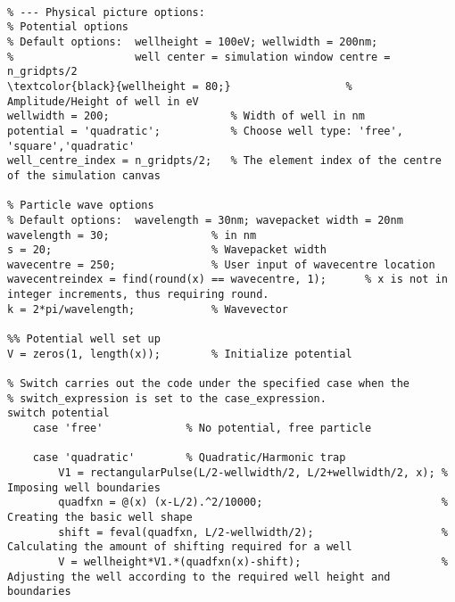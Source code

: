 \documentclass[11pt, oneside]{article}   	%
\begin{document}
{\color{black}
\begin{Verbatim}[commandchars=\\\{\}]

% --- Physical picture options:
% Potential options
% Default options:  wellheight = 100eV; wellwidth = 200nm; 
%                   well center = simulation window centre = n_gridpts/2
\textcolor{black}{wellheight = 80;}                  % Amplitude/Height of well in eV
wellwidth = 200;                   % Width of well in nm
potential = 'quadratic';           % Choose well type: 'free', 'square','quadratic'
well_centre_index = n_gridpts/2;   % The element index of the centre of the simulation canvas

% Particle wave options
% Default options:  wavelength = 30nm; wavepacket width = 20nm
wavelength = 30;                % in nm
s = 20;                         % Wavepacket width
wavecentre = 250;               % User input of wavecentre location
wavecentreindex = find(round(x) == wavecentre, 1);      % x is not in integer increments, thus requiring round. 
k = 2*pi/wavelength;            % Wavevector

%% Potential well set up
V = zeros(1, length(x));        % Initialize potential

% Switch carries out the code under the specified case when the 
% switch_expression is set to the case_expression. 
switch potential
    case 'free'             % No potential, free particle
        
    case 'quadratic'        % Quadratic/Harmonic trap
        V1 = rectangularPulse(L/2-wellwidth/2, L/2+wellwidth/2, x); % Imposing well boundaries
        quadfxn = @(x) (x-L/2).^2/10000;                            % Creating the basic well shape
        shift = feval(quadfxn, L/2-wellwidth/2);                    % Calculating the amount of shifting required for a well
        V = wellheight*V1.*(quadfxn(x)-shift);                      % Adjusting the well according to the required well height and boundaries
        

\end{Verbatim}}
\end{document}
